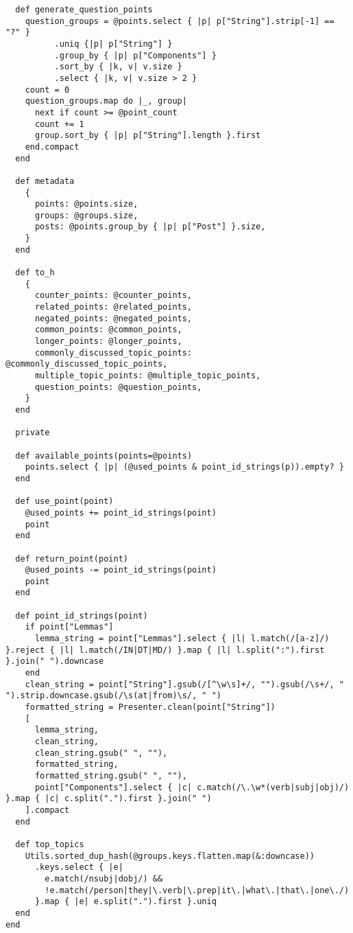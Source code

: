 \documentclass{article}
\begin{document}
\begin{verbatim}
  def generate_question_points
    question_groups = @points.select { |p| p["String"].strip[-1] == "?" }
          .uniq {|p| p["String"] }
          .group_by { |p| p["Components"] }
          .sort_by { |k, v| v.size }
          .select { |k, v| v.size > 2 }
    count = 0
    question_groups.map do |_, group|
      next if count >= @point_count
      count += 1
      group.sort_by { |p| p["String"].length }.first
    end.compact
  end

  def metadata
    {
      points: @points.size,
      groups: @groups.size,
      posts: @points.group_by { |p| p["Post"] }.size,
    }
  end

  def to_h
    {
      counter_points: @counter_points,
      related_points: @related_points,
      negated_points: @negated_points,
      common_points: @common_points,
      longer_points: @longer_points,
      commonly_discussed_topic_points: @commonly_discussed_topic_points,
      multiple_topic_points: @multiple_topic_points,
      question_points: @question_points,
    }
  end

  private

  def available_points(points=@points)
    points.select { |p| (@used_points & point_id_strings(p)).empty? }
  end

  def use_point(point)
    @used_points += point_id_strings(point)
    point
  end

  def return_point(point)
    @used_points -= point_id_strings(point)
    point
  end

  def point_id_strings(point)
    if point["Lemmas"]
      lemma_string = point["Lemmas"].select { |l| l.match(/[a-z]/) }.reject { |l| l.match(/IN|DT|MD/) }.map { |l| l.split(":").first }.join(" ").downcase
    end
    clean_string = point["String"].gsub(/[^\w\s]+/, "").gsub(/\s+/, " ").strip.downcase.gsub(/\s(at|from)\s/, " ")
    formatted_string = Presenter.clean(point["String"])
    [
      lemma_string,
      clean_string,
      clean_string.gsub(" ", ""),
      formatted_string,
      formatted_string.gsub(" ", ""),
      point["Components"].select { |c| c.match(/\.\w*(verb|subj|obj)/) }.map { |c| c.split(".").first }.join(" ")
    ].compact
  end

  def top_topics
    Utils.sorted_dup_hash(@groups.keys.flatten.map(&:downcase))
      .keys.select { |e|
        e.match(/nsubj|dobj/) &&
        !e.match(/person|they|\.verb|\.prep|it\.|what\.|that\.|one\./)
      }.map { |e| e.split(".").first }.uniq
  end
end


\end{verbatim}
\pagebreak
\end{document}
